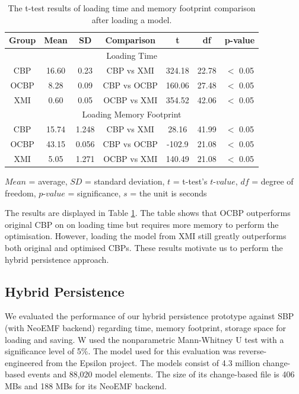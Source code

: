 \documentclass[sigplan,review,anonymous]{acmart}\settopmatter{printfolios=true,printccs=false,printacmref=false}
\begin{document}
\begin{table}[ht]
    \footnotesize
    \centering
    \caption{The t-test results of loading time and memory footprint comparison after loading a model.}
    \label{table:ttest_results_loadtime}
    \begin{tabular}
        {| c c c | c c c c |}
        \hline 
        Group & Mean & SD & Comparison & t  & df & p-value \\  
         \hline 
        \multicolumn{7}{|c|}{Loading Time} \\
        \hline
        CBP & 16.60    & 0.23 &  CBP vs XMI & 324.18   &22.78 & $<$ 0.05 \\
        OCBP &  8.28  &  0.09 & CBP vs OCBP & 160.06 & 27.48 & $<$ 0.05 \\  
        XMI & 0.60   & 0.05 & OCBP vs XMI & 354.52   &42.06  & $<$ 0.05 \\ 
        \hline 
        \multicolumn{7}{|c|}{Loading Memory Footprint} \\
        \hline
        CBP &15.74    & 1.248 &  CBP vs XMI & 28.16   &  41.99 & $<$ 0.05 \\
        OCBP & 43.15   & 0.056 & CBP vs OCBP & -102.9 &21.08 & $<$ 0.05 \\  
        XMI & 5.05   & 1.271 & OCBP vs XMI & 140.49  & 21.08  & $<$ 0.05 \\ 
        \hline 
    \end{tabular}
    $Mean$ = average, $SD$ = standard deviation, $t$ = t-test's $t$-$value$, $df$ = degree of freedom, $p$-$value$ = significance, $s$ = the unit is seconds
\end{table}

The results are displayed in Table \ref{table:ttest_results_loadtime}. The table shows that OCBP outperforms original CBP on on loading time but requires more memory to perform the optimisation. However, loading the model from XMI still greatly outperforms both original and optimised CBPs. These results motivate us to perform the hybrid persistence approach.

\subsection{Hybrid Persistence}
We evaluated the performance of our hybrid persistence prototype against SBP (with NeoEMF backend) regarding time, memory footprint, storage space for loading and saving. W used the nonparametric Mann-Whitney U test with a significance level of 5\%. The model used for this evaluation was reverse-engineered from the Epsilon project. The models consist of 4.3 million change-based events and 88,020 model elements. The size of its change-based file is 406 MBs and  188 MBs for its NeoEMF backend.
\end{document}
